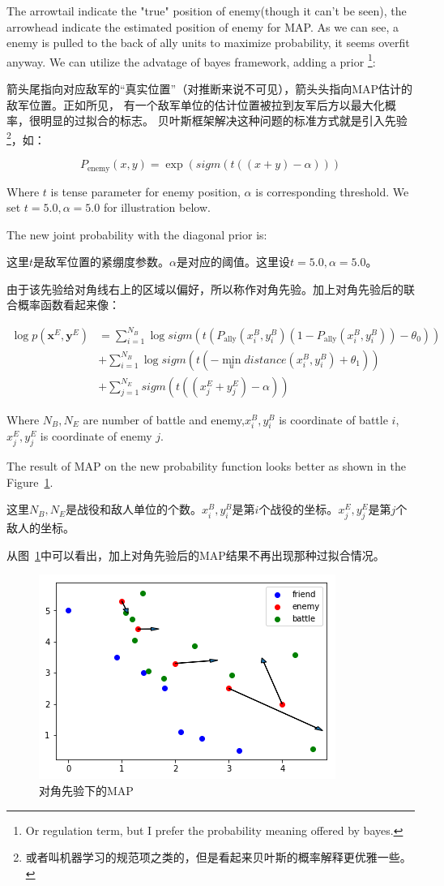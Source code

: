 \documentclass{article}
\begin{document}
The arrowtail indicate the "true" position of enemy(though it can't be seen), 
the arrowhead indicate the estimated position of enemy for MAP. As we can see,
a enemy is pulled to the back of ally units to maximize probability, it seems overfit anyway.
We can utilize the advatage of bayes framework, adding a prior \footnote{Or regulation term, but I
prefer the probability meaning offered by bayes.}:

箭头尾指向对应敌军的“真实位置”（对推断来说不可见），箭头头指向MAP估计的敌军位置。正如所见，
有一个敌军单位的估计位置被拉到友军后方以最大化概率，很明显的过拟合的标志。
贝叶斯框架解决这种问题的标准方式就是引入先验
\footnote{或者叫机器学习的规范项之类的，但是看起来贝叶斯的概率解释更优雅一些。}，如：

$$
P_{\text{enemy}}(x,y) = \exp(sigm(t((x+y) - \alpha)))
$$

Where $t$ is tense parameter for enemy position,
$\alpha$ is corresponding threshold. We set $t=5.0,\alpha=5.0$
for illustration below.

The new joint probability with the diagonal prior is:

这里$t$是敌军位置的紧绷度参数。$\alpha$是对应的阈值。这里设$t=5.0,\alpha=5.0$。

由于该先验给对角线右上的区域以偏好，所以称作对角先验。加上对角先验后的联合概率函数看起来像：

\begin{align*}
\log p(\mathbf{x}^E,\mathbf{y}^E) &= \sum_{i=1}^{N_B} \log sigm(t (P_\text{ally}(x^B_i,y^B_i)(1-P_\text{ally}(x^B_i,y^B_i)) - \theta_0)) \\
                                  &+ \sum_{i=1}^{N_B} \log sigm(t(-\min_{u} distance(x^B_i,y^B_i) + \theta_1)) \\
                                  &+ \sum_{j=1}^{N_E} sigm(t((x^E_j+y^E_j) - \alpha))
\end{align*}

Where $N_B,N_E$ are number of battle and enemy,$x^B_i,y^B_i$ is coordinate of battle $i$, $x^E_j,y^E_j$
is coordinate of enemy $j$.

The result of MAP on the new probability function looks better as shown in the Figure~\ref{fig:MAPtwo}.

这里$N_B,N_E$是战役和敌人单位的个数。$x^B_i,y^B_i$是第$i$个战役的坐标。$x^E_j,y^E_j$是第$j$个敌人的坐标。

从图~\ref{fig:MAPtwo}中可以看出，加上对角先验后的MAP结果不再出现那种过拟合情况。

\begin{figure}[ht]
\includegraphics[width=0.6\linewidth]{MAP2.png}
\caption{对角先验下的MAP}
\label{fig:MAPtwo}
\end{figure}
\end{document}
